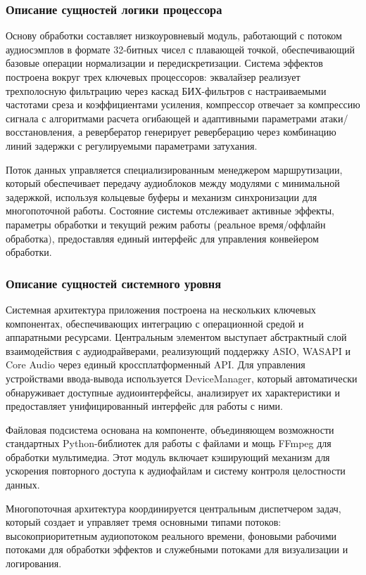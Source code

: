 \subsubsection{Описание сущностей логики процессора}

Основу обработки составляет низкоуровневый модуль, работающий с потоком аудиосэмплов в формате 32-битных чисел с плавающей точкой, обеспечивающий базовые операции нормализации и передискретизации. Система эффектов построена вокруг трех ключевых процессоров: эквалайзер реализует трехполосную фильтрацию через каскад БИХ-фильтров с настраиваемыми частотами среза и коэффициентами усиления, компрессор отвечает за компрессию сигнала с алгоритмами расчета огибающей и адаптивными параметрами атаки/восстановления, а ревербератор генерирует реверберацию через комбинацию линий задержки с регулируемыми параметрами затухания.

Поток данных управляется специализированным менеджером маршрутизации, который обеспечивает передачу аудиоблоков между модулями с минимальной задержкой, используя кольцевые буферы и механизм синхронизации для многопоточной работы. Состояние системы отслеживает активные эффекты, параметры обработки и текущий режим работы (реальное время/оффлайн обработка), предоставляя единый интерфейс для управления конвейером обработки. 

\subsubsection{Описание сущностей системного уровня}

Системная архитектура приложения построена на нескольких ключевых компонентах, обеспечивающих интеграцию с операционной средой и аппаратными ресурсами. Центральным элементом выступает абстрактный слой взаимодействия с аудиодрайверами, реализующий поддержку ASIO, WASAPI и Core Audio через единый кроссплатформенный API. Для управления устройствами ввода-вывода используется DeviceManager, который автоматически обнаруживает доступные аудиоинтерфейсы, анализирует их характеристики и предоставляет унифицированный интерфейс для работы с ними.

Файловая подсистема основана на компоненте, объединяющем возможности стандартных Python-библиотек для работы с файлами и мощь FFmpeg для обработки мультимедиа. Этот модуль включает кэширующий механизм для ускорения повторного доступа к аудиофайлам и систему контроля целостности данных. 

Многопоточная архитектура координируется центральным диспетчером задач, который создает и управляет тремя основными типами потоков: высокоприоритетным аудиопотоком реального времени, фоновыми рабочими потоками для обработки эффектов и служебными потоками для визуализации и логирования.

